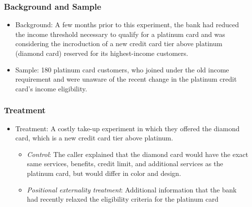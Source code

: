 \documentclass[unicode,12pt]{beamer}
\begin{document}
    \begin{frame}
        \frametitle{Background and Sample}
    
        \begin{itemize}
            \item Background: A few months prior to this experiment, the bank had reduced the income threshold necessary to qualify for a platinum card and was considering the incroduction of a new credit card tier above platinum (diamond card) reserved for its highest-income customers.
            \item Sample: 180 platinum card customers, who joined under the old income requirement and were unaware of the recent change in the platinum credit card's income eligibility.
        \end{itemize}
    
    \end{frame}

    \begin{frame}
        \frametitle{Treatment}
    
        \begin{itemize}
            \item Treatment: A costly take-up experiment in which they offered the diamond card, which is a new credit card tier above platinum.
            \begin{itemize}
                \item \textit{Control}: The caller explained that the diamond card would have the exact same services, benefits, credit limit, and additional services as the platinum card, but would differ in color and design.
                \item \textit{Positional externality treatment}: Additional information that the bank had recently relaxed the eligibility criteria for the platinum card
            \end{itemize}
        \end{itemize}
    
    \end{frame}
\end{document}
